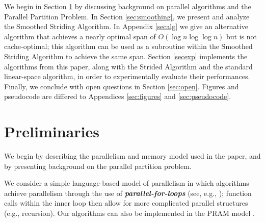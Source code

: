 \documentclass[twocolumn,10pt]{article}
\newcommand{\defn}[1]{{\textit{\textbf{\boldmath #1}}}\xspace}
\renewcommand{\paragraph}[1]{\vspace{0.09in}\noindent{\bf \boldmath #1.}}
\theoremstyle{remark}
\theoremstyle{remark}
\begin{document}


\paragraph{Outline} We begin in Section \ref{secprelim} by discussing
background on parallel algorithms and the Parallel Partition Problem. In
Section \ref{sec:smoothing}, we present and analyze the Smoothed
Striding Algorithm. In Appendix \ref{secalg} we give an alternative
algorithm that achieves a nearly optimal span of
$O(\log n \log \log n)$ but is not cache-optimal; this algorithm can
be used as a subroutine within the Smoothed Striding Algorithm to
achieve the same span. Section \ref{secexp} implements the algorithms
from this paper, along with the Strided Algorithm and the standard
linear-space algorithm, in order to experimentally evaluate their
performances. Finally, we conclude with open questions in Section
\ref{sec:open}. Figures and pseudocode are differed to Appendices
\ref{sec:figures} and \ref{sec:pseudocode}.


\section{Preliminaries}\label{secprelim}

We begin by describing the parallelism and memory model used in
the paper, and by presenting background on the parallel partition problem.

\paragraph{Workflow Model} We consider a simple language-based model of
parallelism in which algorithms achieve parallelism through the use of
\defn{parallel-for-loops} (see, e.g.,
\cite{Blelloch96,AcarBl16,CLRS}); function calls within the inner loop
then allow for more complicated parallel structures (e.g., recursion). Our
algorithms can also be implemented in the PRAM model \cite{Blelloch96,
AcarBl16}.
\end{document}
